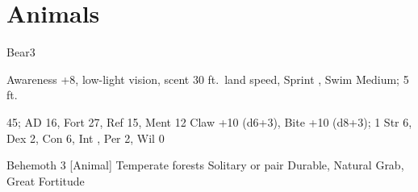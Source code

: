 \section{Animals}

    \begin{monsection}[Black]{Bear}{3}
        \begin{spellcontent}
            \begin{spelltargetinginfo}
                \pari {} Awareness +8, low-light vision, scent
                \pari {} 30 ft.\ land speed, Sprint , Swim 
                \pari {} Medium;  5 ft.
            \end{spelltargetinginfo}
            \begin{spelleffects}
                \pari {} 45;  AD 16, Fort 27, Ref 15, Ment 12
                \pari {} Claw +10 (d6+3), Bite +10 (d8+3);  1
                \pari {} Str 6, Dex 2, Con 6, Int , Per 2, Wil 0
            \end{spelleffects}
        \end{spellcontent}
        \begin{spellfooter}
            \pari {} Behemoth 3 [Animal]
            \pari {} Temperate forests
            \pari {} Solitary or pair
            \pari {} Durable, Natural Grab, Great Fortitude
        \end{spellfooter}
    \end{monsection}
